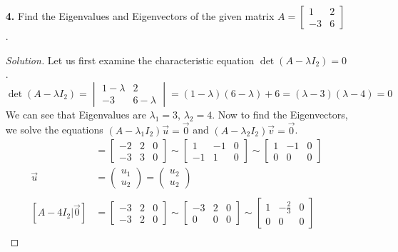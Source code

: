\documentclass[ 12pt ]{article}
\begin{document}
\begin{enumerate}
	\item[\textbf{4.}] Find the Eigenvalues and Eigenvectors of the given matrix $A = \left [ \begin{smallmatrix} 1 & 2 \\ -3 & 6 \end{smallmatrix} \right ]$.

		\begin{proof}[Solution]\renewcommand{\qedsymbol}{}
			Let us first examine the characteristic equation $\det (A - \lambda I_2) = 0$.
			$$\det (A - \lambda I_2) = \begin{vmatrix} 1 - \lambda & 2 \\ -3 & 6 - \lambda \end{vmatrix} = (1 - \lambda)(6 - \lambda) + 6 = (\lambda - 3)(\lambda - 4) = 0$$
			We can see that Eigenvalues are $\lambda_1 = 3$, $\lambda_2 = 4$. Now to find the Eigenvectors, we solve the equations $(A - \lambda_1I_2)\vec{u} = \vec{0}$
			and $(A - \lambda_2I_2)\vec{v} = \vec{0}$.
			\begin{align*}
				[A - 3I_2 | \vec{0}] &= \begin{bmatrix} -2 & 2 & 0 \\ -3 & 3 & 0 \end{bmatrix} \sim \begin{bmatrix} 1 & -1 & 0 \\ -1 & 1 & 0 \end{bmatrix} \sim \begin{bmatrix} 1 & -1 & 0 \\ 0 & 0 & 0 \end{bmatrix} \\
				\vec{u} &= \begin{pmatrix} u_1 \\ u_2 \end{pmatrix} = \begin{pmatrix} u_2 \\ u_2 \end{pmatrix} \\ \\
				[A - 4I_2 | \vec{0}] &= \begin{bmatrix} -3 & 2 & 0 \\ -3 & 2 & 0 \end{bmatrix} \sim \begin{bmatrix} -3 & 2 & 0 \\ 0 & 0 & 0 \end{bmatrix} \sim \begin{bmatrix} 1 & -\frac{2}{3} & 0 \\ 0 & 0 & 0 \end{bmatrix} \\

\end{align*}
\end{proof}
\end{enumerate}
\end{document}
